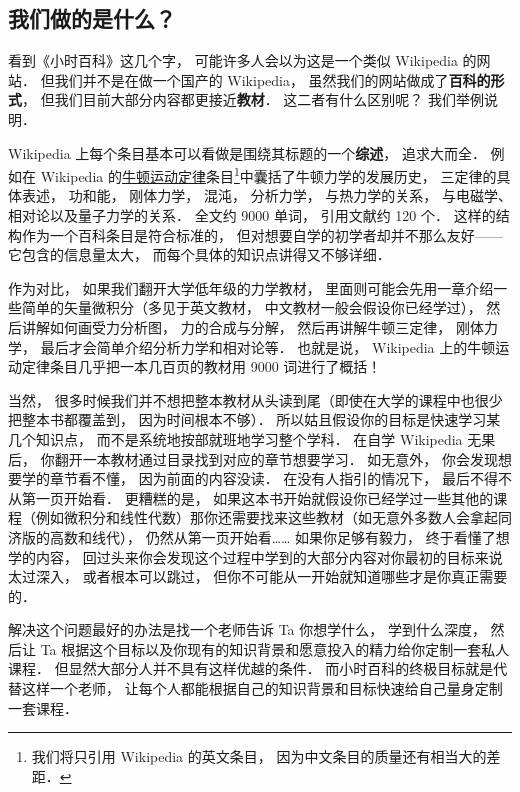 
\subsection{我们做的是什么？}
看到《小时百科》这几个字， 可能许多人会以为这是一个类似 Wikipedia 的网站． 但我们并不是在做一个国产的 Wikipedia， 虽然我们的网站做成了\textbf{百科的形式}， 但我们目前大部分内容都更接近\textbf{教材}． 这二者有什么区别呢？ 我们举例说明．

Wikipedia 上每个条目基本可以看做是围绕其标题的一个\textbf{综述}， 追求大而全． 例如在 Wikipedia 的\href{https://en.wikipedia.org/wiki/Newton's_laws_of_motion}{牛顿运动定律}条目\footnote{我们将只引用 Wikipedia 的英文条目， 因为中文条目的质量还有相当大的差距．}中囊括了牛顿力学的发展历史， 三定律的具体表述， 功和能， 刚体力学， 混沌， 分析力学， 与热力学的关系， 与电磁学、相对论以及量子力学的关系． 全文约 9000 单词， 引用文献约 120 个． 这样的结构作为一个百科条目是符合标准的， 但对想要自学的初学者却并不那么友好——它包含的信息量太大， 而每个具体的知识点讲得又不够详细．

作为对比， 如果我们翻开大学低年级的力学教材， 里面则可能会先用一章介绍一些简单的矢量微积分（多见于英文教材， 中文教材一般会假设你已经学过）， 然后讲解如何画受力分析图， 力的合成与分解， 然后再讲解牛顿三定律， 刚体力学， 最后才会简单介绍分析力学和相对论等． 也就是说， Wikipedia 上的牛顿运动定律条目几乎把一本几百页的教材用 9000 词进行了概括！

当然， 很多时候我们并不想把整本教材从头读到尾（即使在大学的课程中也很少把整本书都覆盖到， 因为时间根本不够）． 所以姑且假设你的目标是快速学习某几个知识点， 而不是系统地按部就班地学习整个学科． 在自学 Wikipedia 无果后， 你翻开一本教材通过目录找到对应的章节想要学习． 如无意外， 你会发现想要学的章节看不懂， 因为前面的内容没读． 在没有人指引的情况下， 最后不得不从第一页开始看． 更糟糕的是， 如果这本书开始就假设你已经学过一些其他的课程（例如微积分和线性代数）那你还需要找来这些教材（如无意外多数人会拿起同济版的高数和线代）， 仍然从第一页开始看…… 如果你足够有毅力， 终于看懂了想学的内容， 回过头来你会发现这个过程中学到的大部分内容对你最初的目标来说太过深入， 或者根本可以跳过， 但你不可能从一开始就知道哪些才是你真正需要的．

解决这个问题最好的办法是找一个老师告诉 Ta 你想学什么， 学到什么深度， 然后让 Ta 根据这个目标以及你现有的知识背景和愿意投入的精力给你定制一套私人课程． 但显然大部分人并不具有这样优越的条件． 而小时百科的终极目标就是代替这样一个老师， 让每个人都能根据自己的知识背景和目标快速给自己量身定制一套课程．

